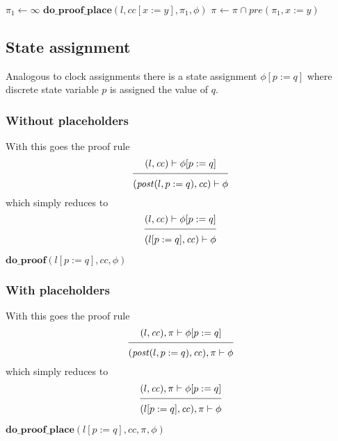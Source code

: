\documentclass{article}
\newcommand{\proofrule}[3][]{#1 \frac{\raisebox{.7ex}{\normalsize{$#2$}}}
  {\raisebox{-1.0ex}{\normalsize{$#3$}}}}
\newcommand{\placeholder}[1][]{\pi_{#1}}
\newcommand{\loc}{l}
\newcommand{\region}{\mathit{cc}}
\newcommand{\post}{\mathit{post}}
\newcommand{\method}[1]{\ensuremath{\mathbf{#1}}}
\begin{document}
\begin{algorithm}[H]
  \caption{$\method{do\_proof\_place\_assign}(\loc, \region, \placeholder, \phi[x := y]$}
  \begin{algorithmic}
    \STATE $\placeholder[1] \gets \infty$
    \STATE $\method{do\_proof\_place}(\loc, \region[x := y], \placeholder[1], \phi)$
    \STATE $\placeholder \gets \placeholder \cap \mathit{pre}(\placeholder[1], x := y)$
  \end{algorithmic}
  \end{algorithm}

\subsection{State assignment}
Analogous to clock assignments there is a state assignment $
\phi[p := q]$ where discrete state variable $p$ is assigned the value of $q$. 


\subsubsection{Without placeholders}
With this goes the proof rule
\[
\proofrule
{(\loc, \region) \vdash \phi[p := q]}
{(\post(\loc, p := q), \region) \vdash \phi}
\]
which simply reduces to
\[
\proofrule
{(\loc, \region) \vdash \phi[p := q]}
{(\loc[p := q], \region) \vdash \phi}
\]

\begin{algorithm}[H]
  \caption{$\method{do\_proof\_sublist}(\loc, \region, \phi[p := q]$}
  \begin{algorithmic}
  \RETURN $\method{do\_proof}(\loc[p := q], \region, \phi)$
  \end{algorithmic}
  \end{algorithm}

\subsubsection{With placeholders}
With this goes the proof rule
\[
\proofrule
{(\loc, \region), \placeholder \vdash \phi[p := q]}
{(\post(\loc, p := q), \region), \placeholder \vdash \phi}
\]
which simply reduces to
\[
\proofrule
{(\loc, \region), \placeholder \vdash \phi[p := q]}
{(\loc[p := q], \region), \placeholder \vdash \phi}
\]

\begin{algorithm}[H]
  \caption{$\method{do\_proof\_place\_sublist}(\loc, \region, \placeholder, \phi[p := q]$}
  \begin{algorithmic}
  \STATE $\method{do\_proof\_place}(\loc[p := q], \region, \placeholder, \phi)$
  \end{algorithmic}
  \end{algorithm}
\end{document}

